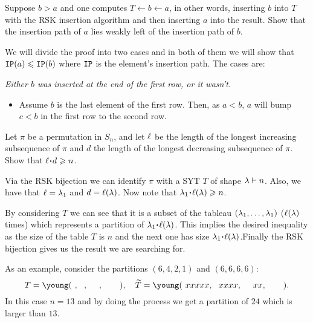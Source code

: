 \documentclass[12pt]{memoir}
\begin{document}
\begin{Ej}[Exercise 1.a]
   Suppose $b > a$ and one computes $T\leftarrow b\leftarrow a$, in other words, inserting $b$ into $T$
   with the RSK insertion algorithm and then inserting $a$ into the result. Show that the insertion
   path of $a$ lies weakly left of the insertion path of $b$.
\end{Ej}

\begin{ptcbr}
We will divide the proof into two cases and in both of them we will show that $\texttt{IP}(a)\leqslant\texttt{IP}(b)$ where $\texttt{IP}$ is the element's insertion path. The cases are: 
\begin{center}
   \emph{Either $b$ was inserted at the end of the first row, or it wasn't.}
\end{center}
\begin{itemize}
   \itemsep=-0.4em
   \item Assume $b$ is the last element of the first row. Then, as $a<b$, $a$ will bump $c<b$ in the first row to the second row. 
\end{itemize}
\end{ptcbr}

\begin{Ej}[Exercise 3]
   Let $\pi$ be a permutation in $S_n$, and let $\ell$ be the length of the longest increasing subsequence
of $\pi$ and $d$ the length of the longest decreasing subsequence of $\pi$. Show that $\l\. d\geq n$. 
\end{Ej}

\begin{ptcbr}
   Via the RSK bijection we can identify $\pi$ with a SYT $T$ of shape $\lambda\vdash n$. Also, we have that $\ell=\lambda_1$ and $d=\ell(\lambda)$. Now note that $\la_1\.\l(\la)\geq n$.\par 
   By considering $T$ we can see that it is a subset of the tableau $(\lambda_1,\dots,\lambda_1)$ ($\ell(\lambda)$ times) which represents a partition of $\la_1\.\l(\la)$. This implies the desired inequality as the size of the table $T$ is $n$ and the next one has size $\la_1\.\l(\la)$.Finally the RSK bijection gives us the result we are searching for. 
\end{ptcbr}

As an example, consider the partitions $(6,4,2,1)$ and $(6,6,6,6)$:
$$T=\young(~,~~,~~~~,~~~~~~),\quad \widetilde{T}=\young(~xxxxx,~~xxxx,~~~~xx,~~~~~~).$$
In this case $n=13$ and by doing the process we get a partition of $24$ which is larger than $13$.
   
\end{document}
